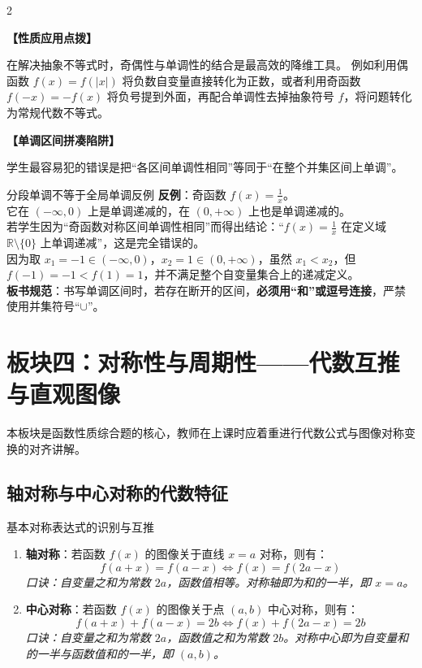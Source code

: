 \documentclass[11pt,a4paper]{ctexart}
\newcommand{\topicteachblock}[2]{%
  \par\addvspace{0.55em}%
  \noindent\textbf{【#1】}\par\nobreak
  \begingroup
    \setlength{\parskip}{0.35em}%
    #2\par
  \endgroup
}
\begin{document}
\begin{paracol}{2}
\topicteachblock{性质应用点拨}{
  在解决抽象不等式时，奇偶性与单调性的结合是最高效的降维工具。
  例如利用偶函数 $f(x) = f(|x|)$ 将负数自变量直接转化为正数，或者利用奇函数 $f(-x) = -f(x)$ 将负号提到外面，再配合单调性去掉抽象符号 $f$，将问题转化为常规代数不等式。
}

\switchcolumn
\topicteachblock{单调区间拼凑陷阱}{
  学生最容易犯的错误是把“各区间单调性相同”等同于“在整个并集区间上单调”。
}
\end{paracol}

\begin{warnbox}{分段单调不等于全局单调反例}
  \textbf{反例}：奇函数 $f(x) = \frac{1}{x}$。\\
  它在 $(-\infty, 0)$ 上是单调递减的，在 $(0, +\infty)$ 上也是单调递减的。\\
  若学生因为“奇函数对称区间单调性相同”而得出结论：“$f(x) = \frac{1}{x}$ 在定义域 $\mathbb{R} \setminus \{0\}$ 上单调递减”，这是完全错误的。\\
  因为取 $x_1 = -1 \in (-\infty, 0)$，$x_2 = 1 \in (0, +\infty)$，虽然 $x_1 < x_2$，但 $f(-1) = -1 < f(1) = 1$，并不满足整个自变量集合上的递减定义。\\
  \textbf{板书规范}：书写单调区间时，若存在断开的区间，\textbf{必须用“和”或逗号连接}，严禁使用并集符号“$\cup$”。
\end{warnbox}

\newpage

\section{板块四：对称性与周期性——代数互推与直观图像}

本板块是函数性质综合题的核心，教师在上课时应着重进行代数公式与图像对称变换的对齐讲解。

\subsection{轴对称与中心对称的代数特征}

\begin{theorembox}{基本对称表达式的识别与互推}
  \begin{enumerate}
    \item \textbf{轴对称}：若函数 $f(x)$ 的图像关于直线 $x = a$ 对称，则有：
          \[ f(a+x) = f(a-x) \iff f(x) = f(2a-x) \]
          \textit{口诀：自变量之和为常数 $2a$，函数值相等。对称轴即为和的一半，即 $x=a$。}
    \item \textbf{中心对称}：若函数 $f(x)$ 的图像关于点 $(a, b)$ 中心对称，则有：
          \[ f(a+x) + f(a-x) = 2b \iff f(x) + f(2a-x) = 2b \]
          \textit{口诀：自变量之和为常数 $2a$，函数值之和为常数 $2b$。对称中心即为自变量和的一半与函数值和的一半，即 $(a, b)$。}
  \end{enumerate}
\end{theorembox}
\end{document}
